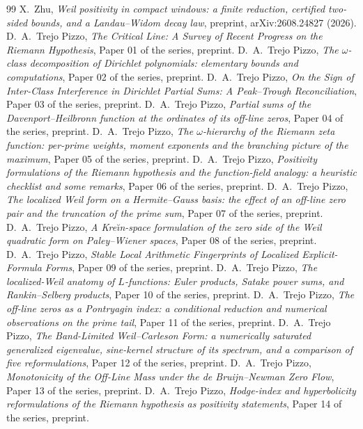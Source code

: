 \documentclass[11pt]{amsart}
\theoremstyle{definition}
\theoremstyle{remark}
\numberwithin{equation}{section}
\begin{document}
\begin{thebibliography}{99}
 X.~Zhu, \emph{Weil positivity in compact windows: a finite reduction, certified two-sided bounds, and a Landau--Widom decay law}, preprint, arXiv:2608.24827 (2026).
 D.~A.~Trejo Pizzo, \emph{The Critical Line: A Survey of Recent Progress on the Riemann Hypothesis}, Paper 01 of the series, preprint.
 D.~A.~Trejo Pizzo, \emph{The $\omega$-class decomposition of Dirichlet polynomials: elementary bounds and computations}, Paper 02 of the series, preprint.
 D.~A.~Trejo Pizzo, \emph{On the Sign of Inter-Class Interference in Dirichlet Partial Sums: A Peak--Trough Reconciliation}, Paper 03 of the series, preprint.
 D.~A.~Trejo Pizzo, \emph{Partial sums of the Davenport--Heilbronn function at the ordinates of its off-line zeros}, Paper 04 of the series, preprint.
 D.~A.~Trejo Pizzo, \emph{The $\omega$-hierarchy of the Riemann zeta function: per-prime weights, moment exponents and the branching picture of the maximum}, Paper 05 of the series, preprint.
 D.~A.~Trejo Pizzo, \emph{Positivity formulations of the Riemann hypothesis and the function-field analogy: a heuristic checklist and some remarks}, Paper 06 of the series, preprint.
 D.~A.~Trejo Pizzo, \emph{The localized Weil form on a Hermite--Gauss basis: the effect of an off-line zero pair and the truncation of the prime sum}, Paper 07 of the series, preprint.
 D.~A.~Trejo Pizzo, \emph{A Kre\u{\i}n-space formulation of the zero side of the Weil quadratic form on Paley--Wiener spaces}, Paper 08 of the series, preprint.
 D.~A.~Trejo Pizzo, \emph{Stable Local Arithmetic Fingerprints of Localized Explicit-Formula Forms}, Paper 09 of the series, preprint.
 D.~A.~Trejo Pizzo, \emph{The localized-Weil anatomy of $L$-functions: Euler products, Satake power sums, and Rankin--Selberg products}, Paper 10 of the series, preprint.
 D.~A.~Trejo Pizzo, \emph{The off-line zeros as a Pontryagin index: a conditional reduction and numerical observations on the prime tail}, Paper 11 of the series, preprint.
 D.~A.~Trejo Pizzo, \emph{The Band-Limited Weil--Carleson Form: a numerically saturated generalized eigenvalue, sine-kernel structure of its spectrum, and a comparison of five reformulations}, Paper 12 of the series, preprint.
 D.~A.~Trejo Pizzo, \emph{Monotonicity of the Off-Line Mass under the de Bruijn--Newman Zero Flow}, Paper 13 of the series, preprint.
 D.~A.~Trejo Pizzo, \emph{Hodge-index and hyperbolicity reformulations of the Riemann hypothesis as positivity statements}, Paper 14 of the series, preprint.

\end{thebibliography}
\end{document}
